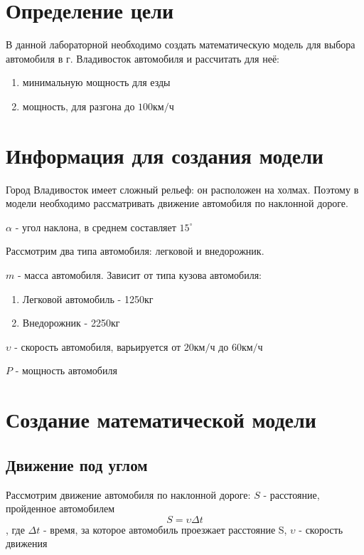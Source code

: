 \documentclass[a4paper, 14pt]{extarticle}
\begin{document}
	\pagebreak	

	\section{Определение цели}
		В данной лабораторной необходимо создать математическую модель для выбора автомобиля в г. Владивосток автомобиля и рассчитать для неё:
		\begin{enumerate}[leftmargin=3\parindent, itemsep=0mm]
			\item минимальную мощность для езды
			\item мощность, для разгона до \(100 \text{км}/\text{ч} \)
		\end{enumerate}

	\section{Информация для создания модели}
		Город Владивосток имеет сложный рельеф: он расположен на холмах. Поэтому в модели необходимо рассматривать движение автомобиля по наклонной дороге.
		
		\(\alpha \) - угол наклона, в среднем составляет \( 15 ^\circ \)
		
		Рассмотрим два типа автомобиля: легковой и внедорожник.
		
		\( m \) - масса автомобиля. Зависит от типа кузова автомобиля:
		\begin{enumerate}[leftmargin=3\parindent, itemsep=0mm]
			\item Легковой автомобиль - 1250кг
			\item Внедорожник - 2250кг
		\end{enumerate}

		\( \upsilon \) - скорость автомобиля, варьируется от \(20 \text{км}/\text{ч} \) до \(60 \text{км}/\text{ч} \) 
		
		\( P \) - мощность автомобиля

	\section{Создание математической модели}
		\subsection{Движение под углом}
			Рассмотрим движение автомобиля по наклонной дороге:
			\( S \) - расстояние, пройденное автомобилем
			\[ S = \upsilon \Delta t \tag{3.1.1} \label{eq:special} \]
			, где \( \Delta t \) - время, за которое автомобиль проезжает расстояние S,
			\( \upsilon \) - скорость движения
	
\end{document}
